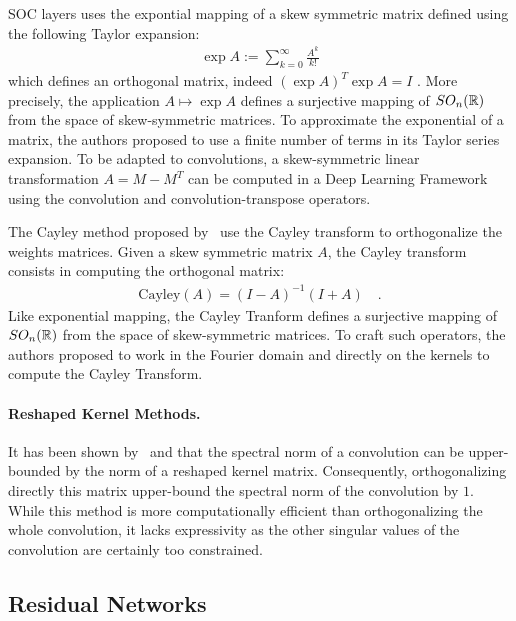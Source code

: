 SOC layers uses the expontial mapping of a skew symmetric matrix defined using the following Taylor expansion:
\begin{align*}
  \exp{A}:=\sum_{k=0}^{\infty}\frac{A^k}{k!}
\end{align*}
which defines an orthogonal matrix, indeed $(\exp{A})^T\exp{A}=I$ . More precisely, the application $A\mapsto\exp{A}$ defines a surjective mapping of $SO_n(\mathbb{R})$ from the space of skew-symmetric matrices. To approximate the exponential of a matrix, the authors proposed to use a finite number of terms in its Taylor series expansion.  To be adapted to convolutions, a skew-symmetric linear transformation $A = M-M^T$ can be  computed in a Deep Learning Framework using the  convolution and convolution-transpose operators.



The Cayley method proposed by~\citet{trockman2021orthogonalizing} use the Cayley transform to orthogonalize the weights matrices. Given a skew symmetric matrix $A$, the Cayley transform consists in computing the orthogonal matrix:
\begin{align*}
   \text{Cayley}(A)= (I - A)^{-1} (I + A) \quad.
\end{align*}
Like exponential mapping, the Cayley Tranform defines  a surjective mapping of $SO_n(\mathbb{R})$ from the space of skew-symmetric matrices. To craft such operators, the authors proposed to work in the Fourier domain and directly on the kernels to compute the Cayley Transform.

\paragraph{Reshaped Kernel Methods.}
It has been shown by~\citet{cisse2017parseval} and \citet{tsuzuku2018lipschitz} that the spectral norm of a convolution can be upper-bounded by the norm of a reshaped kernel matrix. Consequently, orthogonalizing directly this matrix upper-bound the spectral norm of the convolution by $1$.
While this method is more computationally efficient than orthogonalizing the whole convolution, it lacks expressivity as the other singular values of the convolution are certainly too constrained. 



\subsection{Residual Networks}

